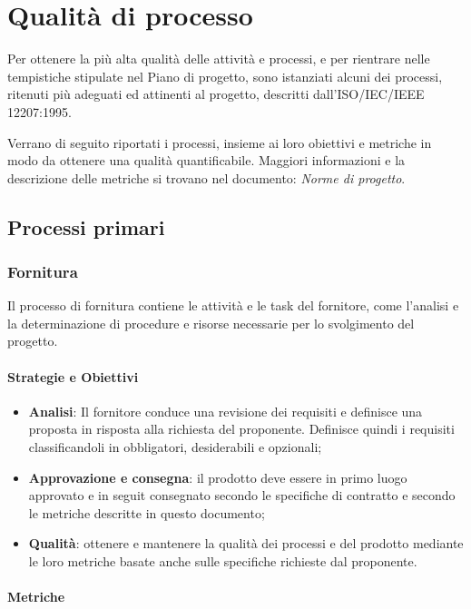\section{Qualità di processo}
Per ottenere la più alta qualità delle attività e processi, e per rientrare nelle tempistiche stipulate nel Piano di progetto, sono istanziati alcuni dei processi, ritenuti più adeguati ed attinenti al progetto, descritti dall'ISO/IEC/IEEE 12207:1995.

Verrano di seguito riportati i processi, insieme ai loro obiettivi e metriche in modo da ottenere una qualità quantificabile. Maggiori informazioni e la descrizione delle metriche si trovano nel documento: \textit{Norme di progetto}.

    \subsection{Processi primari}
    
    
        \subsubsection{Fornitura}
        Il processo di fornitura contiene le attività e le task del fornitore, come l'analisi e la determinazione di procedure e risorse necessarie per lo svolgimento del progetto.
        
            \paragraph{Strategie e Obiettivi}
            \begin{itemize}
                \item \textbf{Analisi}: Il fornitore conduce una revisione dei requisiti e definisce una proposta in risposta alla richiesta del proponente. Definisce quindi i requisiti classificandoli in obbligatori, desiderabili e opzionali;
                \item \textbf{Approvazione e consegna}: il prodotto deve essere in primo luogo approvato e in seguit consegnato secondo le specifiche di contratto e secondo le metriche descritte in questo documento;
                \item \textbf{Qualità}: ottenere e mantenere la qualità dei processi e del prodotto mediante le loro metriche basate anche sulle specifiche richieste dal proponente.
            \end{itemize}
            
            
            \paragraph{Metriche}
            
